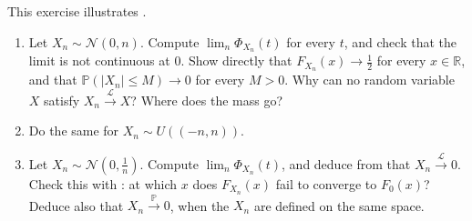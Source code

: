 \begin{exercise}\label{ex:cl-levy-warning}
\easy This exercise illustrates .
\begin{enumerate}[label=(\alph*)]
  \item Let $X_n\sim\mathcal N(0,n)$. Compute $\lim_n\Phi_{X_n}(t)$ for every $t$, and check that
    the limit is not continuous at $0$. Show directly that $F_{X_n}(x)\to\frac12$ for every
    $x\in\mathbb R$, and that $\mathbb P(|X_n|\le M)\to0$ for every $M>0$. Why can no random
    variable $X$ satisfy $X_n\xrightarrow{\mathcal L}X$? Where does the mass go?
  \item Do the same for $X_n\sim U((-n,n))$.
  \item Let $X_n\sim\mathcal N(0,\frac1n)$. Compute $\lim_n\Phi_{X_n}(t)$, and deduce from
     that $X_n\xrightarrow{\mathcal L}0$. Check this with
    : at which $x$ does $F_{X_n}(x)$ fail to converge to $F_0(x)$?
    Deduce also that $X_n\xrightarrow{\mathbb P}0$, when the $X_n$ are defined on the same space.
\end{enumerate}
\end{exercise}

